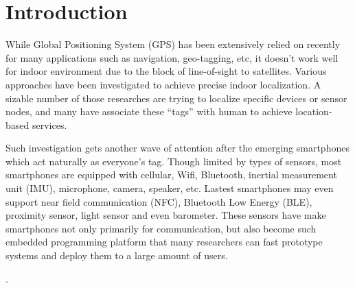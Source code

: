 \section{Introduction}
\label{sec:introduction}

While Global Positioning System (GPS) has been extensively relied on recently for many applications such as navigation, geo-tagging, etc, it doesn't work well for indoor environment due to the block of line-of-sight to satellites. Various approaches have been investigated to achieve precise indoor localization. A sizable number of those researches are trying to localize specific devices or sensor nodes, and many have associate these ``tags'' with human to achieve location-based services. 

Such investigation gets another wave of attention after the emerging smartphones which act naturally as everyone's tag. Though limited by types of sensors, most smartphones are equipped with cellular, Wifi, Bluetooth, inertial measurement unit (IMU), microphone, camera, speaker, etc. Lastest smartphones may even support near field communication (NFC), Bluetooth Low Energy (BLE), proximity sensor, light sensor and even barometer. These sensors have make smartphones not only primarily for communication, but also become such embedded programming platform that many researchers can fast prototype systems and deploy them to a large amount of users.



\cite{JensenEtAl:11:Lab}.


